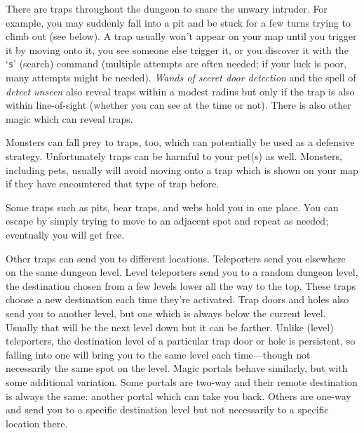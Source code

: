 \documentclass[titlepage]{article}
\begin{document}
There are traps throughout the dungeon to snare the unwary intruder.
For example, you may suddenly fall into a pit and be stuck for a few
turns trying to climb out (see below).
A trap usually won't appear on your map until you trigger it by moving
onto it, you see someone else trigger it, or you discover it with
the `\texttt{s}' (search) command (multiple attempts are often needed;
if your luck is poor, many attempts might be needed).
\textit{Wands of secret door detection} and the spell of \textit{detect unseen}
also reveal traps within a modest radius but only if the trap is also within
line-of-sight (whether you can see at the time or not).
There is also other magic which can reveal traps.

Monsters can fall prey to
traps, too, which can potentially be used as a defensive strategy.
Unfortunately traps can be harmful to your pet(s) as well.
Monsters, including pets, usually will avoid moving onto a trap which
is shown on your map if they have encountered that type of trap before.

Some traps such as pits, bear traps, and webs hold you in one place.
You can escape by simply trying to move to an adjacent spot and repeat
as needed; eventually you will get free.

Other traps can send you to different locations.
Teleporters send you elsewhere on the same dungeon level.
Level teleporters send you to a random dungeon level, the destination
chosen from a few levels lower all the way to the top.
These traps choose a new destination each time they're activated.
Trap doors and holes also send you to another level, but one which is
always below the current level.
Usually that will be the next level down but it can be farther.
Unlike (level) teleporters, the destination level of a particular trap door
or hole is persistent, so falling into one will bring you to the same level
each time---though not necessarily the same spot on the level.
Magic portals behave similarly, but with some additional variation.
Some portals are two-way and their remote destination is always the same:
another portal which can take you back.
Others are one-way and send you to a specific destination level but not
necessarily to a specific location there.
\end{document}
